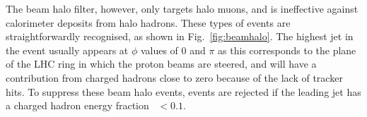 
The beam halo filter, however, only targets halo muons, and is ineffective 
against calorimeter deposits from halo hadrons. These types of events are 
straightforwardly recognised, as shown in Fig.~\ref{fig:beamhalo}. The highest 
\pt jet in the event usually appears at $\phi$ values of 0 and $\pi$ as this 
corresponds to the plane of the LHC ring in which the proton beams are steered, 
and will have a contribution from charged hadrons close to zero because of the 
lack of tracker hits. To suppress these beam halo events, events are rejected 
if the leading jet has a charged hadron energy fraction \chf~$<0.1$.

